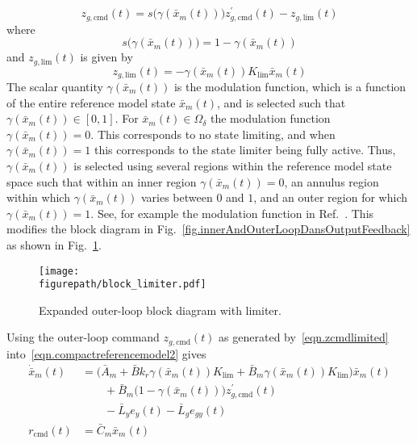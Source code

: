\documentclass[journal]{IEEEtran}
\newcommand{\figurepath}{../fig}
\theoremstyle{innercustomthm}
\begin{document}
  \begin{equation}
    \label{eqn.zcmdlimited}
    z_{g,\text{cmd}}(t) = s\bigr(\gamma(\bar{x}_{m}(t))\bigr)z_{g,\text{cmd}}^{\prime}(t) - z_{g,\text{lim}}(t)
  \end{equation}
  where
  \begin{equation}
    \label{eqn.sofgamma}
    s\bigr(\gamma(\bar{x}_{m}(t))\bigr) = 1-\gamma(\bar{x}_{m}(t))
  \end{equation}
   and $z_{g,\text{lim}}(t)$ is given by
  \begin{equation}
    \label{eqn.zglim}
    z_{g,\text{lim}}(t) = -\gamma(\bar{x}_{m}(t)) K_{\text{lim}}\bar{x}_{m}(t)
  \end{equation}
  The scalar quantity $\gamma(\bar{x}_{m}(t))$ is the modulation function, which is a function of the entire reference model state $\bar{x}_{m}(t)$, and is selected such that $\gamma(\bar{x}_{m}(t))\in[0,1]$.
  For $\bar{x}_{m}(t)\in\Omega_{\delta}$ the modulation function $\gamma(\bar{x}_{m}(t))=0$.
  This corresponds to no state limiting, and when $\gamma(\bar{x}_{m}(t))=1$ this corresponds to the state limiter being fully active.
  Thus, $\gamma(\bar{x}_{m}(t))$ is selected using several regions within the reference model state space such that within an inner region $\gamma(\bar{x}_{m}(t))=0$, an annulus region within which $\gamma(\bar{x}_{m}(t))$ varies between $0$ and $1$, and an outer region for which $\gamma(\bar{x}_{m}(t))=1$.
  See, for example the modulation function in Ref.\ \cite{lavretskywise.book.2013}.
  This modifies the block diagram in Fig.~\ref{fig.innerAndOuterLoopDansOutputFeedback} as shown in Fig.~\ref{fig.innerAndOuterLoopDansOutputFeedbackWithLimiter}.

  \begin{figure}[H]
    \begin{center}
      \texttt{[image: \\figurepath/block\_limiter.pdf]}
      \vspace{-0.1in}
      \caption{Expanded outer-loop block diagram with limiter.\label{fig.innerAndOuterLoopDansOutputFeedbackWithLimiter}}
    \end{center}
  \end{figure}

  Using the outer-loop command $z_{g,\text{cmd}}(t)$ as generated by\ \eqref{eqn.zcmdlimited} into\ \eqref{eqn.compactreferencemodel2} gives
  {%
    \small
    \begin{align}
      \label{eqn.compactrefmodelwithlimiter2}
      \dot{\bar{x}}_{m}(t)
      &=
      \bigr(\bar{A}_{m} + \bar{B}k_{r}\gamma(\bar{x}_{m}(t)) K_{\text{lim}} + \bar{B}_{m}\gamma(\bar{x}_{m}(t)) K_{\text{lim}}\bigr)\bar{x}_{m}(t) \nonumber \\
      & \qquad
      + \bar{B}_{m}\bigr(1-\gamma(\bar{x}_{m}(t))\bigr)z_{g,\text{cmd}}^{\prime}(t) \nonumber \\
      & \qquad
      - \bar{L}_{y}e_{y}(t) - \bar{L}_{g}e_{gy}(t) \\
      r_{\text{cmd}}(t)
      &=
      \bar{C}_{m}\bar{x}_{m}(t) \nonumber
    \end{align}
  }%
\end{document}
